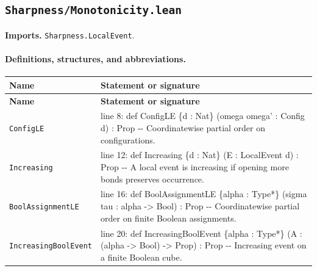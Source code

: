 \documentclass[10pt]{article}
\newcommand{\module}[1]{\texttt{#1}}
\begin{document}
\subsection*{\module{Sharpness/Monotonicity.lean}}
\textbf{Imports.} \module{Sharpness.LocalEvent}.
\paragraph{Definitions, structures, and abbreviations.}
\begin{longtable}{>{\raggedright\arraybackslash}p{} >{\raggedright\arraybackslash}p{}}
\textbf{Name} & \textbf{Statement or signature} \\
\hline
\endfirsthead
\textbf{Name} & \textbf{Statement or signature} \\
\hline
\endhead
\texttt{ConfigLE} & {\ttfamily\scriptsize line 8:\allowbreak{} def ConfigLE \{d :\allowbreak{} Nat\} (\allowbreak{}omega omega' :\allowbreak{} Config d)\allowbreak{} :\allowbreak{} Prop -\allowbreak{}-\allowbreak{} Coordinatewise partial order on configurations.\allowbreak{}} \\[0.45em]
\texttt{Increasing} & {\ttfamily\scriptsize line 12:\allowbreak{} def Increasing \{d :\allowbreak{} Nat\} (\allowbreak{}E :\allowbreak{} LocalEvent d)\allowbreak{} :\allowbreak{} Prop -\allowbreak{}-\allowbreak{} A local event is increasing if opening more bonds preserves occurrence.\allowbreak{}} \\[0.45em]
\texttt{BoolAssignmentLE} & {\ttfamily\scriptsize line 16:\allowbreak{} def BoolAssignmentLE \{alpha :\allowbreak{} Type*\allowbreak{}\} (\allowbreak{}sigma tau :\allowbreak{} alpha -\allowbreak{}> Bool)\allowbreak{} :\allowbreak{} Prop -\allowbreak{}-\allowbreak{} Coordinatewise partial order on finite Boolean assignments.\allowbreak{}} \\[0.45em]
\texttt{IncreasingBoolEvent} & {\ttfamily\scriptsize line 20:\allowbreak{} def IncreasingBoolEvent \{alpha :\allowbreak{} Type*\allowbreak{}\} (\allowbreak{}A :\allowbreak{} (\allowbreak{}alpha -\allowbreak{}> Bool)\allowbreak{} -\allowbreak{}> Prop)\allowbreak{} :\allowbreak{} Prop -\allowbreak{}-\allowbreak{} Increasing event on a finite Boolean cube.\allowbreak{}} \\[0.45em]
\end{longtable}
\end{document}
